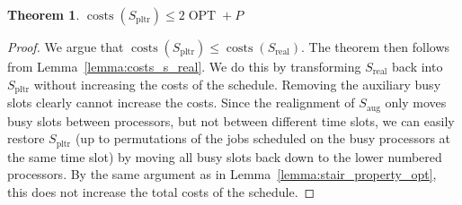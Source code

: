 \documentclass[a4paper]{article}
\DeclareMathOperator{\costs}{costs}
\DeclareMathOperator{\OPT}{OPT}
\DeclareMathOperator{\pltr}{pltr}
\DeclareMathOperator{\aug}{aug}
\DeclareMathOperator{\real}{real}
\newtheorem{theorem}{Theorem}
\begin{document}
\begin{theorem}
  $\costs(S_{\pltr}) \leq 2 \OPT + P$
\end{theorem}
\begin{proof}
  We argue that $\costs(S_{\pltr}) \leq \costs(S_{\real})$.
  The theorem then follows from Lemma~\ref{lemma:costs_s_real}.
  We do this by transforming $S_{\real}$ back into $S_{\pltr}$ without increasing the costs of the schedule.
  Removing the auxiliary busy slots clearly cannot increase the costs.
  Since the realignment of $S_{\aug}$ only moves busy slots between processors, but not between different time slots, we can easily restore $S_{\pltr}$ (up to permutations of the jobs scheduled on the busy processors at the same time slot) by moving all busy slots back down to the lower numbered processors.
  By the same argument as in Lemma~\ref{lemma:stair_property_opt}, this does not increase the total costs of the schedule.
\end{proof}
\end{document}
